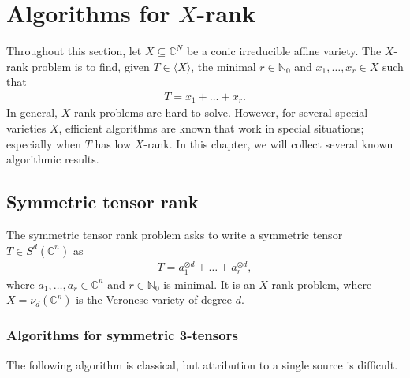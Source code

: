 \chapter{Algorithms for $ X $-rank}
\label{rankAlgorithms-chapter-intro}

Throughout this section, let $ X \subseteq \mathbb C^N  $ be a conic irreducible affine variety. 
The $ X $-rank problem is to find, given $ T\in \langle X \rangle $, the minimal $ r\in \mathbb N_0 $ and $ x_1,\ldots,x_r \in X $ such that 
\begin{align*}
	T = x_1 + \ldots + x_r. 
\end{align*}
In general, $ X $-rank problems are hard to solve. However, for several special varieties $ X $, efficient algorithms are known that work in special situations; especially when $ T $ has low $ X $-rank. 
In this chapter, we will collect several known algorithmic results. 


\section{Symmetric tensor rank}
\label{section-symmetricTensorRank}

The symmetric tensor rank problem asks to write a symmetric tensor $ T\in S^d(\mathbb C^n) $ as
\begin{align*}
	T = a_1^{\otimes d} + \ldots + a_r^{\otimes d}, 
\end{align*}
where $ a_1,\ldots,a_r\in \mathbb C^n $ and $ r \in \mathbb{N}_0$ is minimal. It is an $ X $-rank problem, where $ X = \nu_d(\mathbb C^n) $ is the Veronese variety of degree $ d $. %



\subsection{Algorithms for symmetric 3-tensors}
\label{subsection-algorithmsSymmetric3Tensors}

The following algorithm is classical, but attribution to a single source is difficult. %


